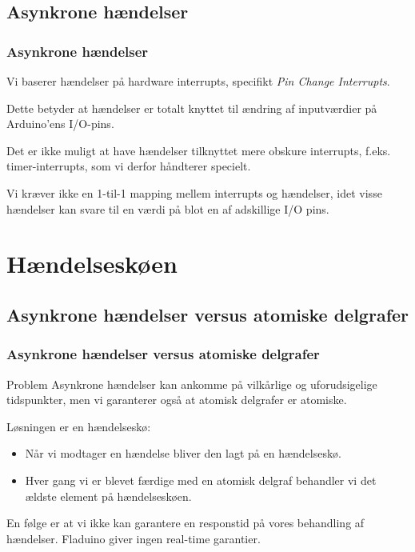 \documentclass{beamer}
\begin{document}
\subsection{Asynkrone hændelser}
\begin{frame}
\frametitle{Asynkrone hændelser}

\begin{block}{}
Vi baserer hændelser på hardware interrupts, specifikt \textit{Pin
  Change Interrupts}.
\end{block}

Dette betyder at hændelser er totalt knyttet til ændring af
inputværdier på Arduino'ens I/O-pins.  

Det er ikke muligt at have hændelser tilknyttet mere obskure
interrupts, f.eks. timer-interrupts, som vi derfor håndterer specielt.
\pause

Vi kræver ikke en 1-til-1 mapping mellem interrupts og hændelser, idet
visse hændelser kan svare til en værdi på blot en af adskillige I/O pins.

\end{frame}

\section{Hændelseskøen}
\subsection{Asynkrone hændelser versus atomiske delgrafer}
\begin{frame}
\frametitle{Asynkrone hændelser versus atomiske delgrafer}

\begin{block}{Problem}
  Asynkrone hændelser kan ankomme på vilkårlige og uforudsigelige
  tidspunkter, men vi garanterer også at atomisk delgrafer er
  atomiske.
\end{block}

\pause

Løsningen er en hændelseskø:

\begin{itemize}
\item Når vi modtager en hændelse bliver den lagt på en hændelseskø.
\item Hver gang vi er blevet færdige med en atomisk delgraf behandler
  vi det ældste element på hændelseskøen.
\end{itemize}

En følge er at vi ikke kan garantere en responstid på vores behandling
af hændelser.  Fladuino giver ingen real-time garantier.

\end{frame}
\end{document}
